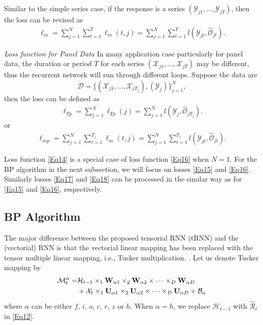 \documentclass[journal]{IEEEtran}
\begin{document}
Similar to the simple series case, if the response is a series $(\mathcal{Y}_{j1}, ..., \mathcal{Y}_{jT})$, then the loss can be revised as
\begin{align}
\ell_m = \sum^N_{j=1}\sum^T_{t=1}\ell_m(t,j) =\sum^N_{j=1}\sum^T_{t=1}l(\mathcal{Y}_{jt}, \widehat{\mathcal{O}}_{jt}).\label{Eq16}
\end{align}

\textit{Loss function for Panel Data} In many application case particularly for panel data, the duration or period $T$ for each series $(\mathcal{X}_{j1}, ..., \mathcal{X}_{jT})$ may be different, thus the recurrent network will run through different loops. Suppose the data are
\[
\mathcal{D} = \{(\mathcal{X}_{j1}, ..., \mathcal{X}_{jT_j}), (\mathcal{Y}_{j})\}^N_{j=1},
\]
then the loss can be defined as
\begin{align}
\ell_{Tp} = \sum^N_{j=1}\ell_{Tp}(j) =\sum^N_{j=1}l(\mathcal{Y}_j, \widehat{\mathcal{O}}_{jT_j}).\label{Eq17}
\end{align}
or
\begin{align}
\ell_{mp} = \sum^N_{j=1}\sum^{T_j}_{t=1}\ell_m(t,j) =\sum^N_{j=1}\sum^{T_j}_{t=1}l(\mathcal{Y}_{jt}, \widehat{\mathcal{O}}_{jt}). \label{Eq18}
\end{align}

Loss function \eqref{Eq14} is a special case of loss function \eqref{Eq16} when $N=1$. For the BP algorithm in the next subsection, we will focus on losses \eqref{Eq15} and \eqref{Eq16}. Similarly losses \eqref{Eq17} and \eqref{Eq18} can be processed in the similar way as for \eqref{Eq15} and \eqref{Eq16}, respectively.
\subsection{BP Algorithm}


The major difference between the proposed tensorial RNN (tRNN) and the (vectorial) RNN is that the vectorial linear mapping has been replaced with the tensor multiple linear mapping, i.e., Tucker multiplication, \cite{KoldaBader2009}. Let us denote Tucker mapping by
\begin{align*}
\mathcal{M}^{\alpha}_t =&\mathcal{H}_{t-1}\times_1 \mathbf W_{\alpha 1}\times_2 \mathbf W_{\alpha 2}\times \cdots \times_D\mathbf{W}_{\alpha D}  \notag\\
& + \mathcal{X}_{t}\times_1 \mathbf U_{\alpha 1}\times_2 \mathbf U_{\alpha 2}\times \cdots \times_D\mathbf{U}_{\alpha D} + \mathcal{B}_{\alpha}  
\end{align*}
where $\alpha$ can be either $f$, $i$, $o$, $c$, $r$, $z$ or $h$. When $\alpha = h$, we replace $\mathcal{H}_{t-1}$ with $\widehat{\mathcal{R}}_t$ in \eqref{Eq12}.
\end{document}
